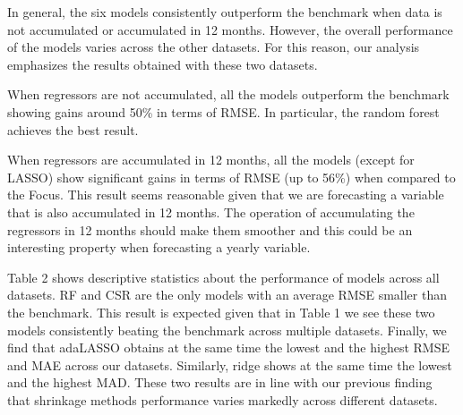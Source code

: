 \documentclass[12pt,openright,twoside,a4paper,brazil,english,emptypage,openany]{abntex2}
\begin{document}
In general, the six models consistently outperform the benchmark when data is not accumulated or accumulated in 12 months. However, the overall performance of the models varies across the other datasets. For this reason, our analysis emphasizes the results obtained with these two datasets.

When regressors are not accumulated, all the models outperform the benchmark showing gains around 50\% in terms of RMSE. In particular, the random forest achieves the best result.

When regressors are accumulated in 12 months, all the models (except for LASSO) show significant gains in terms of RMSE (up to 56\%) when compared to the Focus. This result seems reasonable given that we are forecasting a variable that is also accumulated in 12 months. The operation of accumulating the regressors in 12 months should make them smoother and this could be an interesting property when forecasting a yearly variable.


Table 2 shows descriptive statistics about the performance of models across all datasets. RF and CSR are the only models with an average RMSE smaller than the benchmark. This result is expected given that in Table 1 we see these two models consistently beating the benchmark across multiple datasets. Finally, we find that adaLASSO obtains at the same time the lowest and the highest RMSE and MAE across our datasets. Similarly, ridge shows at the same time the lowest and the highest MAD. These two results are in line with our previous finding that shrinkage methods performance varies markedly across different datasets.  
\end{document}
